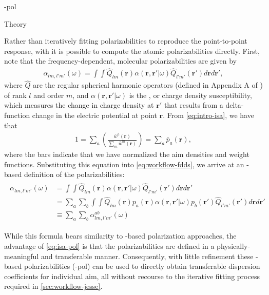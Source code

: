 \begin{subsubsection}{\isa-pol}
\label{sec:workflow-alston}

\begin{paragraph}{Theory}

Rather than iteratively fitting polarizabilities to reproduce the
point-to-point response, with \isa it is possible to
compute the atomic polarizabilities directly. First, note that the
frequency-dependent, molecular polarizabilities are given by 
\begin{align}
\label{eq:workflow-fdds}
\alpha_{lm,l'm'}(\omega) = \int \int
\hat{Q}_{lm}(\bm{r})
\alpha(\bm{r},\bm{r'}|\omega)
\hat{Q}_{l'm'}(\bm{r'})d\bm{r}d\bm{r'},
\end{align}
where $\hat{Q}$ are the regular spherical harmonic operators (defined in
Appendix A of ) of rank $l$ and order $m$, and 
$\alpha(\bm{r},\bm{r'}|\omega)$ is the \fdds, or charge density
susceptibility, which measures the change in charge density at $\bm{r'}$ that
results from a delta-function change in the electric potential at point
$\bm{r}$. From \cref{eq:intro-isa}, we have that
\begin{align}
1 = \sum\limits_a \left ( 
\frac{\bar{w}^a(\bm{r})}{\sum_m \bar{w}^m(\bm{r})}
\right )
= \sum\limits_a \bar{p}_a(\bm{r}),
\end{align}
where the bars indicate that we have normalized the \acrlong{aim} densities
and weight functions. Substituting this
equation into \cref{eq:workflow-fdds}, we arrive at an \isa-based definition
of the \aim polarizabilities:
\begin{align}
\label{eq:isa-pol}
\begin{split}
\alpha_{lm,l'm'}(\omega) &= \int \int
\hat{Q}_{lm}(\bm{r})
\alpha(\bm{r},\bm{r'}|\omega)
\hat{Q}_{l'm'}(\bm{r'})d\bm{r}d\bm{r'} \\
%
&= \sum\limits_a \sum\limits_b \int \int
\hat{Q}_{lm}(\bm{r})
p_a(\bm{r})
\alpha(\bm{r},\bm{r'}|\omega)
p_b(\bm{r'})
\hat{Q}_{l'm'}(\bm{r'})d\bm{r}d\bm{r'} \\
%
&\equiv \sum\limits_a \sum\limits_b 
\alpha_{lm,l'm'}^{ab}(\omega) 
\end{split}
\end{align}

While this formula bears similarity to \dma-based polarization
approaches,\cite{Williams2003,Misquitta2008} the advantage of
\cref{eq:isa-pol} is that the \aim polarizabilities are defined in a
physically-meaningful and transferable manner.
Consequently, with little refinement these \isa-based polarizabilities (\isa-pol) can be used to
directly obtain transferable dispersion coefficients for individual
\acrlong{aim},
all without recourse to the iterative fitting process required in
\cref{sec:workflow-jesse}.



\end{paragraph}
\end{subsubsection}
